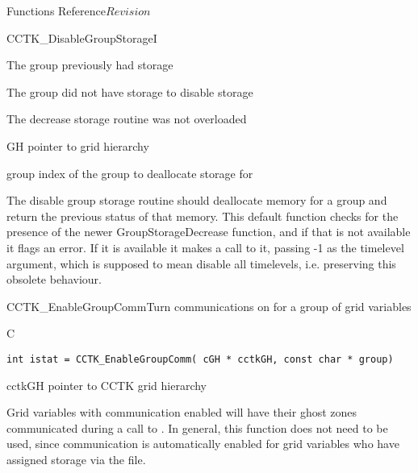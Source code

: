 \begin{cactuspart}{ Functions Reference}{}{$Revision$}
\begin{FunctionDescription}{CCTK\_DisableGroupStorageI}
\begin{ResultSection}
\begin{Result}{0}
The group previously had storage
\end{Result}
\begin{Result}{1}
The group did not have storage to disable storage
\end{Result}
\begin{Result}{-1}
The decrease storage routine was not overloaded
\end{Result}
\end{ResultSection}

\begin{ParameterSection}
\begin{Parameter}{GH}
pointer to grid hierarchy
\end{Parameter}
\begin{Parameter}{group}
index of the group to deallocate storage for
\end{Parameter}
\end{ParameterSection}

\begin{Discussion}
The disable group storage routine should deallocate memory for a group and return the previous status of that memory.
This default function checks for the presence of the newer GroupStorageDecrease function, and if that is not available it flags an error. If it is available it makes a call to it, passing -1 as the timelevel argument, which is supposed to mean disable all timelevels, i.e. preserving this obsolete behaviour.
\end{Discussion}
\end{FunctionDescription}


\begin{FunctionDescription}{CCTK\_EnableGroupComm}{Turn communications on for a group of grid variables}
\label{CCTK-EnableGroupComm}
\begin{SynopsisSection}
\begin{Synopsis}{C}
\begin{verbatim}int istat = CCTK_EnableGroupComm( cGH * cctkGH, const char * group)\end{verbatim}
\end{Synopsis}
\end{SynopsisSection}
\begin{ParameterSection}
\begin{Parameter}{cctkGH}
pointer to CCTK grid hierarchy
\end{Parameter}
\end{ParameterSection}
\begin{Discussion}
Grid variables with communication enabled will have their ghost zones communicated during a call
to . In general, this function does not need to be used, since communication
is automatically enabled for grid variables who have assigned storage via the 
file.
\end{Discussion}
\end{FunctionDescription}


\end{cactuspart}
